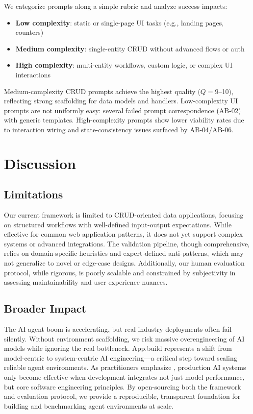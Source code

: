 \documentclass[11pt]{article}
\begin{document}
We categorize prompts along a simple rubric and analyze success impacts:

\begin{itemize}
\item \textbf{Low complexity}: static or single-page UI tasks (e.g., landing pages, counters)
\item \textbf{Medium complexity}: single-entity CRUD without advanced flows or auth
\item \textbf{High complexity}: multi-entity workflows, custom logic, or complex UI interactions
\end{itemize}

Medium-complexity CRUD prompts achieve the highest quality ($Q=9$--10), reflecting strong scaffolding for data models and handlers. Low-complexity UI prompts are not uniformly easy: several failed prompt correspondence (AB-02) with generic templates. High-complexity prompts show lower viability rates due to interaction wiring and state-consistency issues surfaced by AB-04/AB-06.

\section{Discussion}
\label{sec:discussion}

\subsection{Limitations}
\label{sec:limitations}

Our current framework is limited to CRUD-oriented data applications, focusing on structured workflows with well-defined input-output expectations. While effective for common web application patterns, it does not yet support complex systems or advanced integrations. The validation pipeline, though comprehensive, relies on domain-specific heuristics and expert-defined anti-patterns, which may not generalize to novel or edge-case designs. Additionally, our human evaluation protocol, while rigorous, is poorly scalable and constrained by subjectivity in assessing maintainability and user experience nuances.

\subsection{Broader Impact}
\label{sec:broader-impact}

The AI agent boom is accelerating, but real industry deployments often fail silently. Without environment scaffolding, we risk massive overengineering of AI models while ignoring the real bottleneck. App.build represents a shift from model-centric to system-centric AI engineering—a critical step toward scaling reliable agent environments. As practitioners emphasize \citep{babushkin2025machine}, production AI systems only become effective when development integrates not just model performance, but core software engineering principles. By open-sourcing both the framework and evaluation protocol, we provide a reproducible, transparent foundation for building and benchmarking agent environments at scale.
\end{document}
